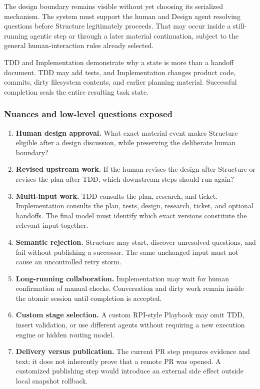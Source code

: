 \documentclass[11pt]{article}
\begin{document}
The design boundary remains visible without yet choosing its serialized mechanism. The system must support the human and Design agent resolving questions before Structure legitimately proceeds. That may occur inside a still-running agentic step or through a later material continuation, subject to the general human-interaction rules already selected.

TDD and Implementation demonstrate why a state is more than a handoff document. TDD may add tests, and Implementation changes product code, commits, dirty filesystem contents, and earlier planning material. Successful completion seals the entire resulting task state.

\subsubsection{Nuances and low-level questions exposed}

\begin{enumerate}
  \item \textbf{Human design approval.} What exact material event makes Structure eligible after a design discussion, while preserving the deliberate human boundary?
  \item \textbf{Revised upstream work.} If the human revises the design after Structure or revises the plan after TDD, which downstream steps should run again?
  \item \textbf{Multi-input work.} TDD consults the plan, research, and ticket. Implementation consults the plan, tests, design, research, ticket, and optional handoffs. The final model must identify which exact versions constitute the relevant input together.
  \item \textbf{Semantic rejection.} Structure may start, discover unresolved questions, and fail without publishing a successor. The same unchanged input must not cause an uncontrolled retry storm.
  \item \textbf{Long-running collaboration.} Implementation may wait for human confirmation of manual checks. Conversation and dirty work remain inside the atomic session until completion is accepted.
  \item \textbf{Custom stage selection.} A custom RPI-style Playbook may omit TDD, insert validation, or use different agents without requiring a new execution engine or hidden routing model.
  \item \textbf{Delivery versus publication.} The current PR step prepares evidence and text; it does not inherently prove that a remote PR was opened. A customized publishing step would introduce an external side effect outside local snapshot rollback.
\end{enumerate}
\end{document}
